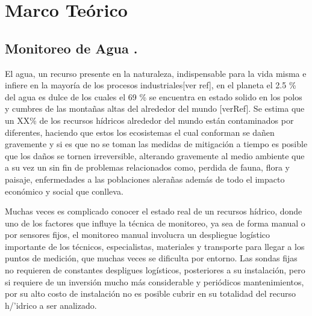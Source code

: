 

\chapter[Capítulo 2. Marco Te\'orico.]{Marco Te\'orico\label{etiqueta}}


\section{Monitoreo de Agua .}
El agua, un recurso presente en la naturaleza, indispensable para la vida misma e infiere en la mayoría de los procesos industriales[ver ref], en el planeta el 2.5 \% del agua es dulce de los cuales el 69 \% se encuentra en estado solido en los polos y cumbres de las monta\~nas altas del alrededor del mundo  [verRef].
Se estima que un XX\% de los recursos h\'idricos alrededor del mundo están contaminados por diferentes, haciendo que estos los ecosistemas el cual conforman se da\~nen gravemente y si es que no se toman las medidas de mitigaci\'on a tiempo es posible que los da\~nos se tornen irreversible, alterando gravemente al medio ambiente que a su vez un sin fin de problemas relacionados como, perdida de fauna, flora y paisaje, enfermedades a las poblaciones alera\~nas adem\'as de todo el impacto econ\'omico y social que conlleva.

Muchas veces es complicado conocer el estado real de un recursos h\'idrico, donde uno de los factores que influye la t\'ecnica de monitoreo, ya sea de forma manual o por sensores fijos, el monitoreo manual involucra un despliegue log\'istico importante de los t\'ecnicos, especialistas, materiales y transporte para llegar a los puntos de medici\'on, que muchas veces se dificulta por entorno. %
Las sondas fijas no requieren de constantes despligues log\'isticos, posteriores a su  instalaci\'on, pero si requiere de un inversi\'on mucho m\'as considerable y peri\'odicos mantenimientos, por su alto costo de instalaci\'on no es posible cubrir en su totalidad del recurso h/'idrico a ser analizado. %

